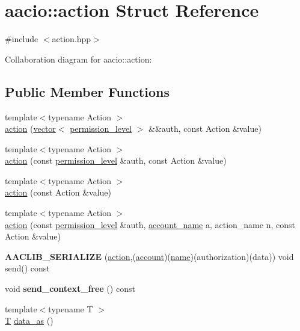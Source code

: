 \hypertarget{structaacio_1_1action}{}\section{aacio\+:\+:action Struct Reference}
\label{structaacio_1_1action}


{\ttfamily \#include $<$action.\+hpp$>$}



Collaboration diagram for aacio\+:\+:action\+:
\subsection*{Public Member Functions}
\begin{DoxyCompactItemize}
\item 
{\footnotesize template$<$typename Action $>$ }\\\mbox{\hyperlink{structaacio_1_1action_a4f3fa4d4b99bb0d105dd9349e8f84da1}{action}} (\mbox{\hyperlink{classstd_1_1vector}{vector}}$<$ \mbox{\hyperlink{structaacio_1_1permission__level}{permission\+\_\+level}} $>$ \&\&auth, const Action \&value)
\item 
{\footnotesize template$<$typename Action $>$ }\\\mbox{\hyperlink{structaacio_1_1action_ab91b6ad4408160b65753305edef44bcf}{action}} (const \mbox{\hyperlink{structaacio_1_1permission__level}{permission\+\_\+level}} \&auth, const Action \&value)
\item 
{\footnotesize template$<$typename Action $>$ }\\\mbox{\hyperlink{structaacio_1_1action_ac0bc0e57e62d1ee6411db792b01d4944}{action}} (const Action \&value)
\item 
{\footnotesize template$<$typename Action $>$ }\\\mbox{\hyperlink{structaacio_1_1action_ad4d3cd6efc862563256323ae622d01fe}{action}} (const \mbox{\hyperlink{structaacio_1_1permission__level}{permission\+\_\+level}} \&auth, \mbox{\hyperlink{structaacio_1_1chain_1_1name}{account\+\_\+name}} a, action\+\_\+name n, const Action \&value)
\item 
\mbox{\label{structaacio_1_1action_a79e44a961ccac340c6db851fb77b997b}} 
{\bfseries A\+A\+C\+L\+I\+B\+\_\+\+S\+E\+R\+I\+A\+L\+I\+ZE} (\mbox{\hyperlink{structaacio_1_1action}{action}},(\mbox{\hyperlink{structaccount}{account}})(\mbox{\hyperlink{structaacio_1_1name}{name}})(authorization)(data)) void send() const
\item 
\mbox{\label{structaacio_1_1action_a1fe496dc629e29806b0d79487e95af03}} 
void {\bfseries send\+\_\+context\+\_\+free} () const
\item 
{\footnotesize template$<$typename T $>$ }\\\mbox{\hyperlink{struct_t}{T}} \mbox{\hyperlink{structaacio_1_1action_a400ffee1d8c1ae4262e601dbf6ec5fc0}{data\+\_\+as}} ()
\end{DoxyCompactItemize}
